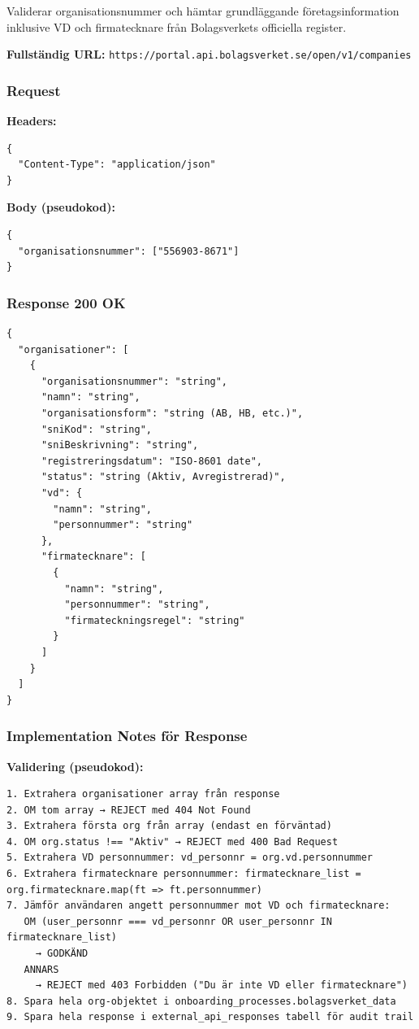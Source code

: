Validerar organisationsnummer och hämtar grundläggande företagsinformation inklusive VD och firmatecknare från Bolagsverkets officiella register.

\textbf{Fullständig URL:} \texttt{https://portal.api.bolagsverket.se/open/v1/companies}

\subsubsection{Request}

\textbf{Headers:}
\begin{lstlisting}
{
  "Content-Type": "application/json"
}
\end{lstlisting}

\textbf{Body (pseudokod):}
\begin{lstlisting}
{
  "organisationsnummer": ["556903-8671"]
}
\end{lstlisting}

\subsubsection{Response 200 OK}
\begin{lstlisting}
{
  "organisationer": [
    {
      "organisationsnummer": "string",
      "namn": "string",
      "organisationsform": "string (AB, HB, etc.)",
      "sniKod": "string",
      "sniBeskrivning": "string",
      "registreringsdatum": "ISO-8601 date",
      "status": "string (Aktiv, Avregistrerad)",
      "vd": {
        "namn": "string",
        "personnummer": "string"
      },
      "firmatecknare": [
        {
          "namn": "string",
          "personnummer": "string",
          "firmateckningsregel": "string"
        }
      ]
    }
  ]
}
\end{lstlisting}

\subsubsection{Implementation Notes för Response}

\textbf{Validering (pseudokod):}
\begin{lstlisting}
1. Extrahera organisationer array från response
2. OM tom array → REJECT med 404 Not Found
3. Extrahera första org från array (endast en förväntad)
4. OM org.status !== "Aktiv" → REJECT med 400 Bad Request
5. Extrahera VD personnummer: vd_personnr = org.vd.personnummer
6. Extrahera firmatecknare personnummer: firmatecknare_list = org.firmatecknare.map(ft => ft.personnummer)
7. Jämför användaren angett personnummer mot VD och firmatecknare:
   OM (user_personnr === vd_personnr OR user_personnr IN firmatecknare_list)
     → GODKÄND
   ANNARS
     → REJECT med 403 Forbidden ("Du är inte VD eller firmatecknare")
8. Spara hela org-objektet i onboarding_processes.bolagsverket_data
9. Spara hela response i external_api_responses tabell för audit trail
\end{lstlisting}


